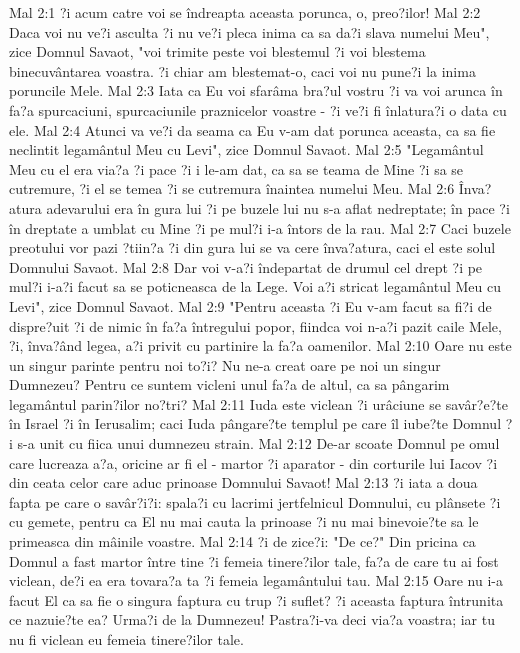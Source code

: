 Mal 2:1  ?i acum catre voi se îndreapta aceasta porunca, o, preo?ilor!
Mal 2:2  Daca voi nu ve?i asculta ?i nu ve?i pleca inima ca sa da?i slava numelui Meu", zice Domnul Savaot, "voi trimite peste voi blestemul ?i voi blestema binecuvântarea voastra. ?i chiar am blestemat-o, caci voi nu pune?i la inima poruncile Mele.
Mal 2:3  Iata ca Eu voi sfarâma bra?ul vostru ?i va voi arunca în fa?a spurcaciuni, spurcaciunile praznicelor voastre - ?i ve?i fi înlatura?i o data cu ele.
Mal 2:4  Atunci va ve?i da seama ca Eu v-am dat porunca aceasta, ca sa fie neclintit legamântul Meu cu Levi", zice Domnul Savaot.
Mal 2:5  "Legamântul Meu cu el era via?a ?i pace ?i i le-am dat, ca sa se teama de Mine ?i sa se cutremure, ?i el se temea ?i se cutremura înaintea numelui Meu.
Mal 2:6  Înva?atura adevarului era în gura lui ?i pe buzele lui nu s-a aflat nedreptate; în pace ?i în dreptate a umblat cu Mine ?i pe mul?i i-a întors de la rau.
Mal 2:7  Caci buzele preotului vor pazi ?tiin?a ?i din gura lui se va cere înva?atura, caci el este solul Domnului Savaot.
Mal 2:8  Dar voi v-a?i îndepartat de drumul cel drept ?i pe mul?i i-a?i facut sa se poticneasca de la Lege. Voi a?i stricat legamântul Meu cu Levi", zice Domnul Savaot.
Mal 2:9  "Pentru aceasta ?i Eu v-am facut sa fi?i de dispre?uit ?i de nimic în fa?a întregului popor, fiindca voi n-a?i pazit caile Mele, ?i, înva?ând legea, a?i privit cu partinire la fa?a oamenilor.
Mal 2:10  Oare nu este un singur parinte pentru noi to?i? Nu ne-a creat oare pe noi un singur Dumnezeu? Pentru ce suntem vicleni unul fa?a de altul, ca sa pângarim legamântul parin?ilor no?tri?
Mal 2:11  Iuda este viclean ?i urâciune se savâr?e?te în Israel ?i în Ierusalim; caci Iuda pângare?te templul pe care îl iube?te Domnul ?i s-a unit cu fiica unui dumnezeu strain.
Mal 2:12  De-ar scoate Domnul pe omul care lucreaza a?a, oricine ar fi el - martor ?i aparator - din corturile lui Iacov ?i din ceata celor care aduc prinoase Domnului Savaot!
Mal 2:13  ?i iata a doua fapta pe care o savâr?i?i: spala?i cu lacrimi jertfelnicul Domnului, cu plânsete ?i cu gemete, pentru ca El nu mai cauta la prinoase ?i nu mai binevoie?te sa le primeasca din mâinile voastre.
Mal 2:14  ?i de zice?i: "De ce?" Din pricina ca Domnul a fast martor între tine ?i femeia tinere?ilor tale, fa?a de care tu ai fost viclean, de?i ea era tovara?a ta ?i femeia legamântului tau.
Mal 2:15  Oare nu i-a facut El ca sa fie o singura faptura cu trup ?i suflet? ?i aceasta faptura întrunita ce nazuie?te ea? Urma?i de la Dumnezeu! Pastra?i-va deci via?a voastra; iar tu nu fi viclean eu femeia tinere?ilor tale.
